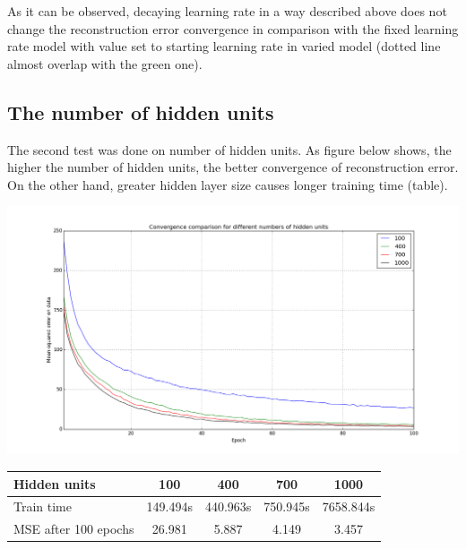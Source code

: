 \documentclass[a4paper]{scrartcl}
\begin{document}
As it can be observed, decaying learning rate in a way described above does not change the reconstruction error convergence in comparison with the fixed learning rate model with value set to starting learning rate in varied model (dotted line almost overlap with the green one).
\subsection{The number of hidden units}
\par The second test was done on number of hidden units. As figure below shows, the higher the number of hidden units, the better convergence of reconstruction error. On the other hand, greater hidden layer size causes longer training time (table).
\begin{center}
\includegraphics[width=14cm]{images/hu.png}
\end{center}

\hspace{1cm}
\begin{tabular}{ | l || c | c | c | c | } 
	\hline
	Hidden units & 100 & 400 & 700 & 1000 \\ \hline
	Train time & 149.494s & 440.963s & 750.945s & 7658.844s \\ \hline
	MSE after 100 epochs & 26.981 & 5.887 & 4.149 & 3.457\\ 
	\hline 
\end{tabular}
\end{document}

